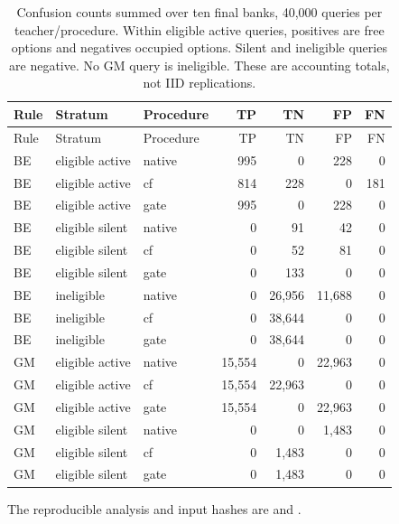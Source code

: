 {\small

\begin{longtable}{lllrrrr}
\caption{Confusion counts summed over ten final banks, 40,000 queries per
teacher/procedure. Within eligible active queries, positives are free options
and negatives occupied options. Silent and ineligible queries are negative.
No GM query is ineligible. These are accounting totals, not IID replications.}\\
\toprule Rule & Stratum & Procedure & TP & TN & FP & FN \\
\midrule\endfirsthead
\toprule Rule & Stratum & Procedure & TP & TN & FP & FN \\
\midrule\endhead
BE & eligible active & native & 995 & 0 & 228 & 0 \\
BE & eligible active & cf & 814 & 228 & 0 & 181 \\
BE & eligible active & gate & 995 & 0 & 228 & 0 \\
BE & eligible silent & native & 0 & 91 & 42 & 0 \\
BE & eligible silent & cf & 0 & 52 & 81 & 0 \\
BE & eligible silent & gate & 0 & 133 & 0 & 0 \\
BE & ineligible & native & 0 & 26,956 & 11,688 & 0 \\
BE & ineligible & cf & 0 & 38,644 & 0 & 0 \\
BE & ineligible & gate & 0 & 38,644 & 0 & 0 \\
GM & eligible active & native & 15,554 & 0 & 22,963 & 0 \\
GM & eligible active & cf & 15,554 & 22,963 & 0 & 0 \\
GM & eligible active & gate & 15,554 & 0 & 22,963 & 0 \\
GM & eligible silent & native & 0 & 0 & 1,483 & 0 \\
GM & eligible silent & cf & 0 & 1,483 & 0 & 0 \\
GM & eligible silent & gate & 0 & 1,483 & 0 & 0 \\
\bottomrule
\end{longtable}

}
The reproducible analysis and input hashes are
 and
.
